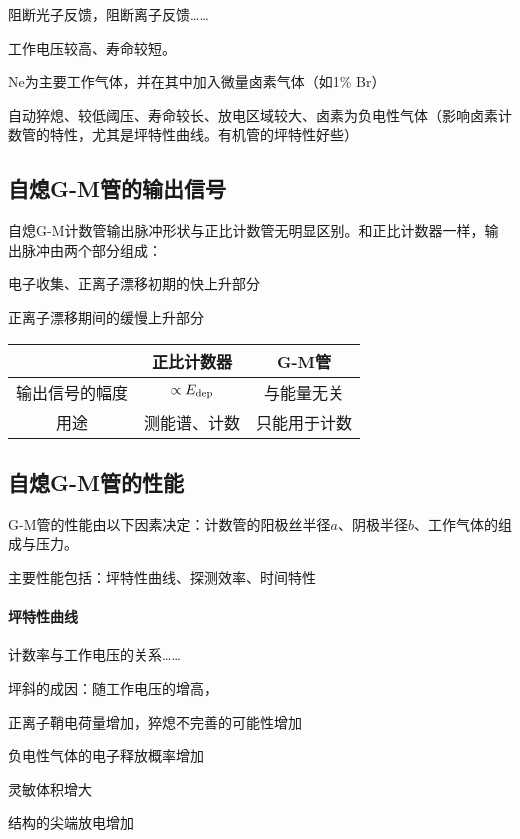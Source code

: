 阻断光子反馈，阻断离子反馈……

工作电压较高、寿命较短。


Ne为主要工作气体，并在其中加入微量卤素气体（如1\% Br）

自动猝熄、较低阈压、寿命较长、放电区域较大、卤素为负电性气体（影响卤素计数管的特性，尤其是坪特性曲线。有机管的坪特性好些）

\subsection{自熄G-M管的输出信号}

自熄G-M计数管输出脉冲形状与正比计数管无明显区别。和正比计数器一样，输出脉冲由两个部分组成：
\begin{compactenum}
	\item 电子收集、正离子漂移初期的快上升部分
	\item 正离子漂移期间的缓慢上升部分
\end{compactenum}
\begin{center}
	\begin{tabular}{ccc}
		\toprule
		&正比计数器&G-M管\\
		\midrule
		输出信号的幅度&$\propto E_{\mathrm{dep}}$&与能量无关\\
		用途&测能谱、计数&只能用于计数\\
		\bottomrule
	\end{tabular}
\end{center}

\subsection{自熄G-M管的性能}

G-M管的性能由以下因素决定：计数管的阳极丝半径$a$、阴极半径$b$、工作气体的组成与压力。

主要性能包括：坪特性曲线、探测效率、时间特性
\paragraph{坪特性曲线}计数率与工作电压的关系……

坪斜的成因：随工作电压的增高，
\begin{compactenum}
	\item 正离子鞘电荷量增加，猝熄不完善的可能性增加
	\item 负电性气体的电子释放概率增加
	\item 灵敏体积增大
	\item 结构的尖端放电增加
\end{compactenum}
